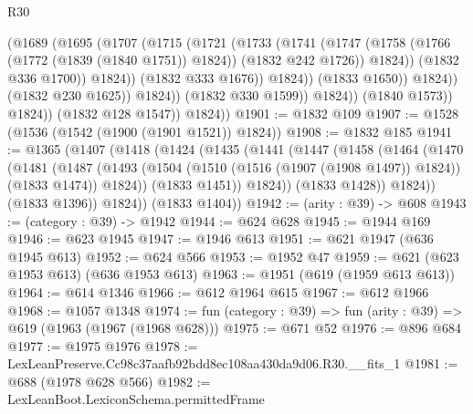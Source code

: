 \begin{lexlean}{R30}
\begin{coremodule}
                                  (@1689
                                    (@1695
                                      (@1707
                                        (@1715
                                          (@1721
                                            (@1733
                                              (@1741
                                                (@1747
                                                  (@1758
                                                    (@1766 (@1772 (@1839 (@1840 @1751)) @1824))
                                                    (@1832 @242 @1726))
                                                  @1824))
                                              (@1832 @336 @1700))
                                            @1824))
                                        (@1832 @333 @1676))
                                      @1824))
                                  (@1833 @1650))
                                @1824))
                            (@1832 @230 @1625))
                          @1824))
                      (@1832 @330 @1599))
                    @1824))
                (@1840 @1573))
              @1824))
          (@1832 @128 @1547))
        @1824))
@1901 := @1832 @109
@1907 := @1528 (@1536 (@1542 (@1900 (@1901 @1521)) @1824))
@1908 := @1832 @185
@1941 := @1365
    (@1407
      (@1418
        (@1424
          (@1435
            (@1441
              (@1447
                (@1458
                  (@1464
                    (@1470
                      (@1481
                        (@1487
                          (@1493
                            (@1504 (@1510 (@1516 (@1907 (@1908 @1497)) @1824)) (@1833 @1474))
                            @1824))
                        (@1833 @1451))
                      @1824))
                  (@1833 @1428))
                @1824))
            (@1833 @1396))
          @1824))
      (@1833 @1404))
@1942 := (arity : @39) -> @608
@1943 := (category : @39) -> @1942
@1944 := @624 @628
@1945 := @1944 @169
@1946 := @623 @1945
@1947 := @1946 @613
@1951 := @621 @1947 (@636 @1945 @613)
@1952 := @624 @566
@1953 := @1952 @47
@1959 := @621 (@623 @1953 @613) (@636 @1953 @613)
@1963 := @1951 (@619 (@1959 @613 @613))
@1964 := @614 @1346
@1966 := @612 @1964 @615
@1967 := @612 @1966
@1968 := @1057 @1348
@1974 := fun (category : @39) => fun (arity : @39) => @619 (@1963 (@1967 (@1968 @628)))
@1975 := @671 @52
@1976 := @896 @684
@1977 := @1975 @1976
@1978 := LexLeanPreserve.Cc98c37aafb92bdd8ec108aa430da9d06.R30.__fits_1
@1981 := @688 (@1978 @628 @566)
@1982 := LexLeanBoot.LexiconSchema.permittedFrame

\end{coremodule}
\end{lexlean}
